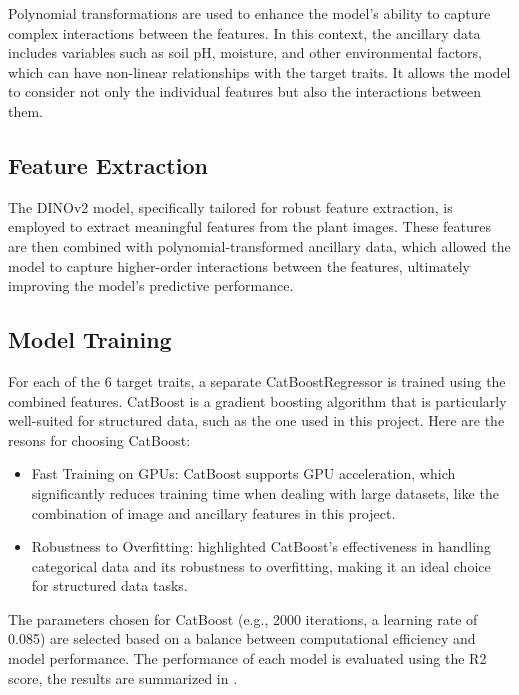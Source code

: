 \documentclass{article}
\begin{document}
Polynomial transformations are used to enhance the model's ability to capture complex interactions between the features. In this context, the ancillary data includes variables such as soil pH, moisture, and other environmental factors, which can have non-linear relationships with the target traits. It allows the model to consider not only the individual features but also the interactions between them.

\subsection{Feature Extraction}
The DINOv2 model, specifically tailored for robust feature extraction, is employed to extract meaningful features from the plant images. These features are then combined with polynomial-transformed ancillary data, which allowed the model to capture higher-order interactions between the features, ultimately improving the model's predictive performance.

\subsection{Model Training}
For each of the 6 target traits, a separate CatBoostRegressor is trained using the combined features. CatBoost is a gradient boosting algorithm that is particularly well-suited for structured data, such as the one used in this project. Here are the resons for choosing CatBoost:

\begin{itemize}
	\item Fast Training on GPUs: CatBoost supports GPU acceleration, which significantly reduces training time when dealing with large datasets, like the combination of image and ancillary features in this project.
	\item Robustness to Overfitting: \citet{CatBoost} highlighted CatBoost's effectiveness in handling categorical data and its robustness to overfitting, making it an ideal choice for structured data tasks.
\end{itemize}

The parameters chosen for CatBoost (e.g., 2000 iterations, a learning rate of 0.085) are selected based on a balance between computational efficiency and model performance. The performance of each model is evaluated using the R2 score, the results are summarized in .
\end{document}
